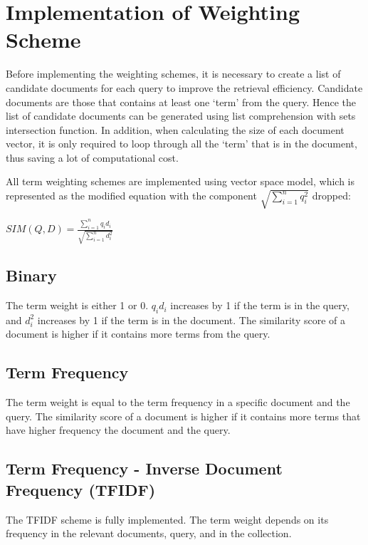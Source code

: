 \documentclass[12pt, a4paper]{article}
\begin{document}
\section{Implementation of Weighting Scheme}
Before implementing the weighting schemes, it is necessary to create a list of candidate documents
for each query to improve the retrieval efficiency. Candidate documents are those that contains at
least one `term' from the query. Hence the list of candidate documents can be generated using list
comprehension with sets intersection function. In addition, when calculating the size of each
document vector, it is only required to loop through all the `term' that is in the document, thus
saving a lot of computational cost.

All term weighting schemes are implemented using vector space model, which is represented as the
modified equation with the component $\sqrt{\sum\nolimits_{i=1}^n q_i^2} $ dropped:

\begin{center}
  $ SIM(Q, D) = \frac{\sum\nolimits_{i=1}^n q_i d_i}{\sqrt{\sum\nolimits_{i=1}^n d_i^2}}$
\end{center}


\subsection{Binary}
The term weight is either 1 or 0. $q_i d_i$ increases by 1 if the term is in the query, and $d_i^2$
increases by 1 if the term is in the document. The similarity score of a document is higher if it
contains more terms from the query.

\subsection{Term Frequency}
The term weight is equal to the term frequency in a specific document and the query. The similarity
score of a document is higher if it contains more terms that have higher frequency the document and
the query.

\subsection{Term Frequency - Inverse Document Frequency (TFIDF)}
The TFIDF scheme is fully implemented. The term weight depends on its frequency in the relevant
documents, query, and in the collection.
\end{document}
